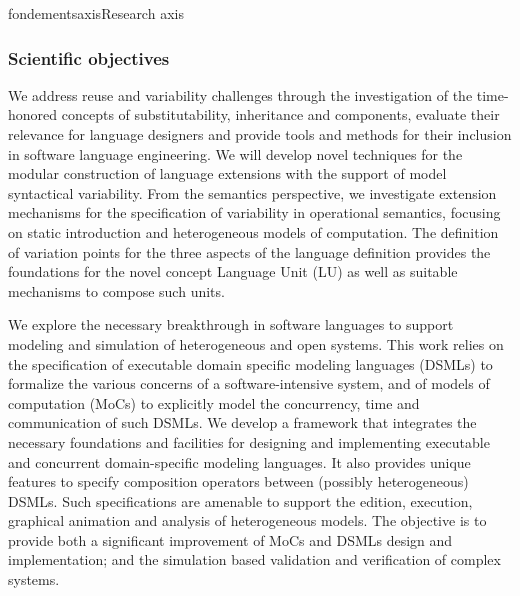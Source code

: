 \documentclass{ra2018}
\begin{document}
\begin{module}{fondements}{axis}{Research axis}
\subsubsection*{Scientific objectives} 

We address reuse and variability challenges through the investigation of the time-honored concepts of substitutability, inheritance and components, evaluate their relevance for language designers and provide tools and methods for their inclusion in software language engineering.
We will develop novel techniques for the modular construction of language extensions with the support of model syntactical variability. From the semantics perspective, we investigate extension mechanisms for the specification of variability in  operational semantics, focusing on static introduction and heterogeneous models of computation. The definition of variation points for the three aspects of the language definition provides the foundations for the novel concept Language Unit (LU) as well as suitable mechanisms to compose such units.


We explore the necessary breakthrough in software languages to support modeling and simulation of heterogeneous and open systems. This work relies on the specification of executable domain specific modeling languages (DSMLs) to formalize the various concerns of a software-intensive system, and of models of computation (MoCs) to explicitly model the concurrency, time and communication of such DSMLs. We develop a framework that integrates the necessary foundations and facilities for designing and
implementing executable and concurrent domain-specific modeling languages. It also provides unique features to specify composition operators between (possibly heterogeneous) DSMLs. Such specifications are amenable to support the edition, execution, graphical animation and analysis of heterogeneous models. The objective is to provide both a significant improvement of MoCs and DSMLs design and implementation; and the simulation based validation and verification of complex systems.



\end{module}
\end{document}
